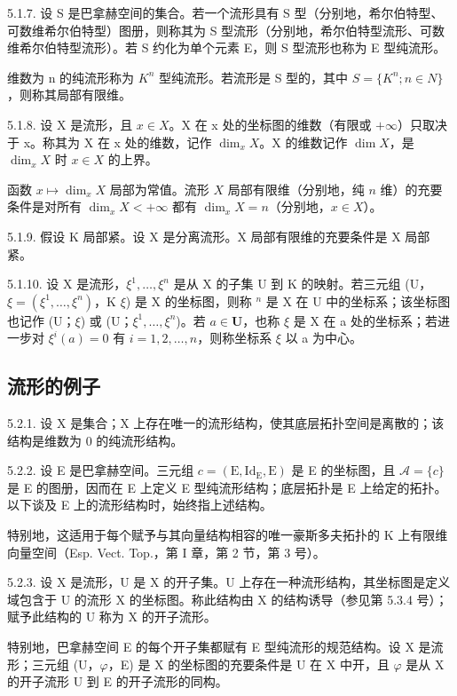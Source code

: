 5.1.7. 设 S 是巴拿赫空间的集合。若一个流形具有 S 型（分别地，希尔伯特型、可数维希尔伯特型）图册，则称其为 S 型流形（分别地，希尔伯特型流形、可数维希尔伯特型流形）。若 S 约化为单个元素 E，则 S 型流形也称为 E 型纯流形。

维数为 n 的纯流形称为 \(K^{n}\) 型纯流形。若流形是 S 型的，其中 \(S = \{K^{n}; n \in N\}\)，则称其局部有限维。

5.1.8. 设 X 是流形，且 \(x \in X\)。X 在 x 处的坐标图的维数（有限或 \(+\infty\)）只取决于 x。称其为 X 在 x 处的维数，记作 \(\dim_{x}X\)。X 的维数记作 \(\dim X\)，是 \(\dim_{x}X\) 时 \(x \in X\) 的上界。

函数 \(x \mapsto \dim_x X\) 局部为常值。流形 \(X\) 局部有限维（分别地，纯 \(n\) 维）的充要条件是对所有 \(\dim_x X < +\infty\) 都有 \(\dim_x X = n\)（分别地，\(x \in X\)）。

5.1.9. 假设 K 局部紧。设 X 是分离流形。X 局部有限维的充要条件是 X 局部紧。

5.1.10. 设 X 是流形，\(\xi^{1},\ldots,\xi^{n}\) 是从 X 的子集 U 到 K 的映射。若三元组 (U，\(\xi=(\xi^{1},\ldots,\xi^{n})\)，K \(\xi\)) 是 X 的坐标图，则称 \(^{n}\) 是 X 在 U 中的坐标系；该坐标图也记作 (U；\(\xi\)) 或 (U；\(\xi^{1},\ldots,\xi^{n}\))。若 \(a\in\mathbf{U}\)，也称 \(\xi\) 是 X 在 a 处的坐标系；若进一步对 \(\xi^{i}(a)=0\) 有 \(i=1,2,\ldots,n\)，则称坐标系 \(\xi\) 以 a 为中心。

\subsection{流形的例子}

5.2.1. 设 X 是集合；X 上存在唯一的流形结构，使其底层拓扑空间是离散的；该结构是维数为 0 的纯流形结构。

5.2.2. 设 E 是巴拿赫空间。三元组 \(c = (\mathrm{E}, \mathrm{Id}_{\mathrm{E}}, \mathrm{E})\) 是 E 的坐标图，且 \(\mathcal{A} = \{c\}\) 是 E 的图册，因而在 E 上定义 E 型纯流形结构；底层拓扑是 E 上给定的拓扑。以下谈及 E 上的流形结构时，始终指上述结构。

特别地，这适用于每个赋予与其向量结构相容的唯一豪斯多夫拓扑的 K 上有限维向量空间（Esp. Vect. Top.，第 I 章，第 2 节，第 3 号）。

5.2.3. 设 X 是流形，U 是 X 的开子集。U 上存在一种流形结构，其坐标图是定义域包含于 U 的流形 X 的坐标图。称此结构由 X 的结构诱导（参见第 5.3.4 号）；赋予此结构的 U 称为 X 的开子流形。

特别地，巴拿赫空间 E 的每个开子集都赋有 E 型纯流形的规范结构。设 X 是流形；三元组 (U，\(\varphi\)，E) 是 X 的坐标图的充要条件是 U 在 X 中开，且 \(\varphi\) 是从 X 的开子流形 U 到 E 的开子流形的同构。

